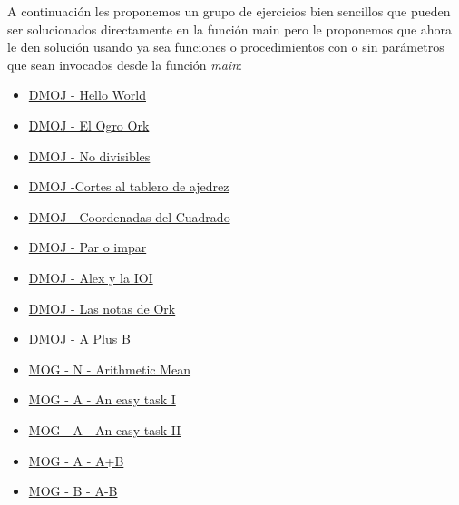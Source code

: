 A continuación les proponemos un grupo de ejercicios bien sencillos que pueden ser solucionados directamente en la función main pero le proponemos que ahora le den solución usando ya sea funciones o procedimientos con o sin parámetros que sean invocados desde la función \emph{main}:

\begin{itemize}
	\item \href{https://dmoj.uclv.edu.cu/problem/hello}{DMOJ - Hello World}
	\item \href{https://dmoj.uclv.edu.cu/problem/ogroork}{DMOJ - El Ogro Ork}
	\item \href{https://dmoj.uclv.edu.cu/problem/divide}{DMOJ - No divisibles}
	\item \href{https://dmoj.uclv.edu.cu/problem/crne}{DMOJ -Cortes al tablero de ajedrez}
	\item \href{https://dmoj.uclv.edu.cu/problem/22psna}{DMOJ - Coordenadas del Cuadrado}
	\item \href{https://dmoj.uclv.edu.cu/problem/evenodd}{DMOJ - Par o impar}
	\item \href{https://dmoj.uclv.edu.cu/problem/alexandioi}{DMOJ - Alex y la IOI}
	\item \href{https://dmoj.uclv.edu.cu/problem/notasork}{DMOJ - Las notas de Ork}
	\item \href{https://dmoj.uclv.edu.cu/problem/aplusb}{DMOJ - A Plus B}
	\item \href{https://matcomgrader.com/problem/9661/arithmetic-mean/}{MOG - N - Arithmetic Mean}
	\item \href{https://matcomgrader.com/problem/9585/an-easy-task-i/} {MOG - A - An easy task I}
	\item \href{https://matcomgrader.com/problem/9587/an-easy-task-ii/}{MOG - A - An easy task II}
	\item \href{https://matcomgrader.com/problem/9607/a-b/}{MOG - A - A+B}
	\item \href{https://matcomgrader.com/problem/9608/a-b/}{MOG - B - A-B}
\end{itemize}
